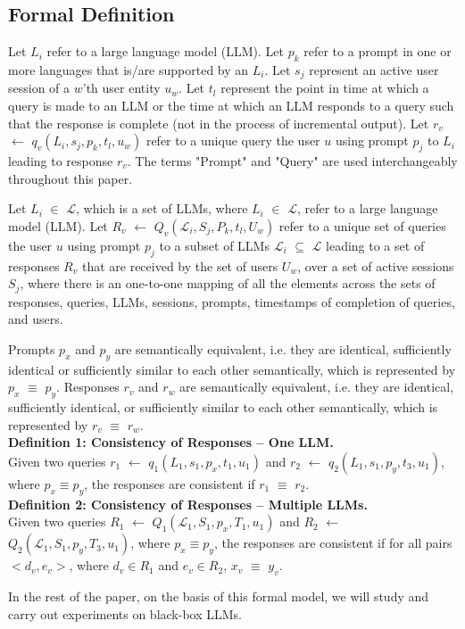 \subsection{Formal Definition}

Let $L_i$ refer to a large language model (LLM). Let $p_k$ refer to a prompt in one or more languages that is/are supported by an $L_i$. Let $s_j$ represent an active user session of a $w$'th user entity $u_w$. Let $t_l$ represent the point in time at which a query is made to an LLM or the time at which an LLM responds to a query such that the response is complete (not in the process of incremental output). 
Let $r_v$ $\xleftarrow{}$ $q_v(L_i, s_j, p_k, t_l, u_w)$ refer to a unique query the user $u$ using prompt $p_j$ to $L_i$ leading to response $r_v$. The terms "Prompt" and "Query" are used interchangeably throughout this paper.

Let $L_i$ $\in$ $\mathcal{L}$, which is a set of  LLMs, where $L_i$ $\in$ $\mathcal{L}$, refer to a large language model (LLM). Let $R_v$ $\xleftarrow{}$ $Q_v(\mathcal{L}_i, S_j, P_k, t_l, U_w)$ refer to a unique set of queries the user $u$ using prompt $p_j$ to a subset of LLMs $\mathcal{L}_i$ $\subseteq$ $\mathcal{L}$ leading to a set of responses $R_v$ that are received by the set of users $U_w$, over a set of active sessions $S_j$, where there is an one-to-one mapping of all the elements across the sets of responses, queries, LLMs, sessions, prompts, timestamps of completion of queries, and users.


Prompts $p_x$ and $p_y$ are semantically equivalent, i.e. they are identical, sufficiently identical or sufficiently similar to each other semantically, which is represented by $p_x$ $\equiv$ $p_y$. Responses $r_v$ and $r_w$ are semantically equivalent, i.e. they are identical, sufficiently identical, or sufficiently similar to each other semantically, which is represented by $r_v$ $\equiv$ $r_w$.\\ 

\textbf{Definition 1: Consistency of Responses -- One LLM.}\\
    Given two queries $r_1$  $\xleftarrow{}$ $q_1(L_1, s_1, p_x, t_1, u_1)$ and $r_2$  $\xleftarrow{}$ $q_2(L_1, s_1, p_y, t_3, u_1)$, where $p_x \equiv p_y$, the responses are consistent if $r_1$ $\equiv$ $r_2$.\\ 

\textbf{Definition 2: Consistency of Responses -- Multiple LLMs.}\\ 
    Given two queries $R_1$  $\xleftarrow{}$ $Q_1(\mathcal{L}_1, S_1, p_x, T_1, u_1)$ and $R_2$  $\xleftarrow{}$ $Q_2(\mathcal{L}_1, S_1, p_y, T_3, u_1)$, where $p_x \equiv p_y$, the responses are consistent if for all pairs $<d_v, e_v>$, where $d_v \in R_1$  and $e_v \in R_2$,  $x_v$ $\equiv$ $y_v$.

In the rest of the paper, on the basis of this formal model, we will study and carry out experiments on black-box LLMs. 

